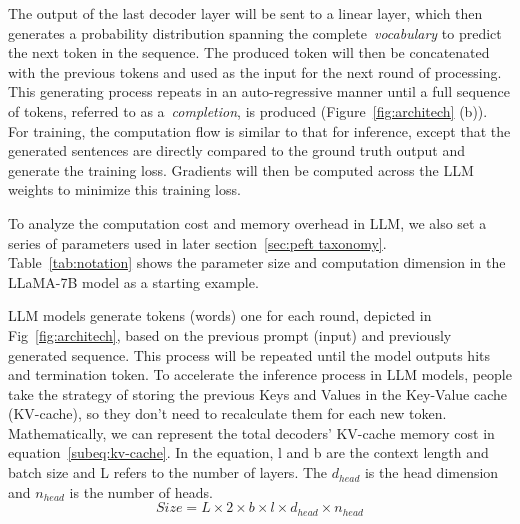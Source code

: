 The output of the last decoder layer will be sent to a linear layer, which then generates a probability distribution spanning the complete~\textit{vocabulary} to predict the next token in the sequence. The produced token will then be concatenated with the previous tokens and used as the input for the next round of processing. This generating process repeats in an auto-regressive manner until a full sequence of tokens, referred to as a~\textit{completion}, is produced (Figure~\ref{fig:architech} (b)). For training, the computation flow is similar to that for inference, except that the generated sentences are directly compared to the ground truth output and generate the training loss. Gradients will then be computed across the LLM weights to minimize this training loss.


To analyze the computation cost and memory overhead in LLM, we also set a series of parameters used in later section~\ref{sec:peft taxonomy}. Table~\ref{tab:notation} shows the parameter size and computation dimension in the LLaMA-7B model as a starting example.

LLM models generate tokens (words) one for each round, depicted in Fig~\ref{fig:architech}, based on the previous prompt (input) and previously generated sequence.  This process will be repeated until the model outputs hits and termination token.
To accelerate the inference process in LLM models, people take the strategy of storing the previous Keys and Values in the Key-Value cache (KV-cache), so they don't need to recalculate them for each new token. Mathematically, we can represent the total decoders' KV-cache memory cost in equation~\ref{subeq:kv-cache}. In the equation, l and b are the context length and batch size and L refers to the number of layers. The $d_{head}$ is the head dimension and $n_{head}$ is the number of heads.
\begin{equation}
    Size = L \times  2\times b \times l \times   d_{head} \times n_{head} \label{subeq:kv-cache}
\end{equation}

\begin{table}
\caption{Configuration parameters and computation operation for LLaMA-7B architecture}
\centering
{}
\label{tab:notation}
\end{table}






